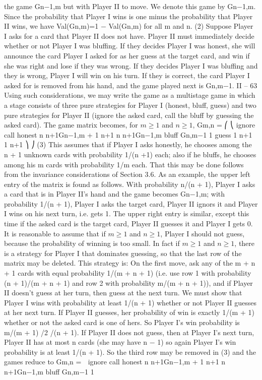 \documentclass[]{report}
\begin{document}
the game Gn−1,m but with Player II to move. We denote this game by Gn−1,m. Since the
probability that Player I wins is one minus the probability that Player II wins, we have
Val(Gn,m)=1 − Val(Gn,m) for all m and n. (2)
Suppose Player I asks for a card that Player II does not have. Player II must immediately
decide whether or not Player I was bluffing. If they decides Player I was honest, she
will announce the card Player I asked for as her guess at the target card, and win if she
was right and lose if they was wrong. If they decides Player I was bluffing and they is wrong,
Player I will win on his turn. If they is correct, the card Player I asked for is removed from
his hand, and the game played next is Gn,m−1.
II – 63
Using such considerations, we may write the game as a multistage game in which
a stage consists of three pure strategies for Player I (honest, bluff, guess) and two pure
strategies for Player II (ignore the asked card, call the bluff by guessing the asked card).
The game matrix becomes, for $m \geq 1$ and $n \geq 1$,
Gm,n =
⎛
⎝
ignore call
honest n
n+1Gn−1,m + 1
n+1
n
n+1Gn−1,m
bluff Gn,m−1 1
guess 1
n+1
1
n+1
⎞
⎠ (3)
This assumes that if Player I asks honestly, he chooses among the n + 1 unknown
cards with probability 1/(n +1) each; also if he bluffs, he chooses among his m cards with
probability 1/m each. That this may be done follows from the invariance considerations
of Section 3.6.
As an example, the upper left entry of the matrix is found as follows. With probability
n/(n + 1), Player I asks a card that is in Player II’s hand and the game becomes Gn−1,m;
with probability 1/(n + 1), Player I asks the target card, Player II ignors it and Player I
wins on his next turn, i.e. gets 1. The upper right entry is similar, except this time if the
asked card is the target card, Player II guesses it and Player I gets 0.
It is reasonable to assume that if $m \geq 1$ and $n \geq 1$, Player I should not guess,
because the probability of winning is too small. In fact if $m \geq 1$ and $n \geq 1$, there is a
strategy for Player I that dominates guessing, so that the last row of the matrix may be
deleted. This strategy is: On the first move, ask any of the m + n + 1 cards with equal
probability 1/(m + n + 1) (i.e. use row 1 with probability (n + 1)/(m + n + 1) and row
2 with probability m/(m + n + 1)), and if Player II doesn’t guess at her turn, then guess
at the next turn. We must show that Player I wins with probability at least 1/(n + 1)
whether or not Player II guesses at her next turn. If Player II guesses, her probability of
win is exactly 1/(m + 1) whether or not the asked card is one of hers. So Player I’s win
probability is m/(m + 1) /2 /(n + 1). If Player II does not guess, then at Player
I’s next turn, Player II has at most n cards (she may have n − 1) so again Player I’s win
probability is at least 1/(n + 1).
So the third row may be removed in (3) and the games reduce to
Gm,n =

ignore call
honest n
n+1Gn−1,m + 1
n+1
n
n+1Gn−1,m
bluff Gn,m−1 1
\end{document}
